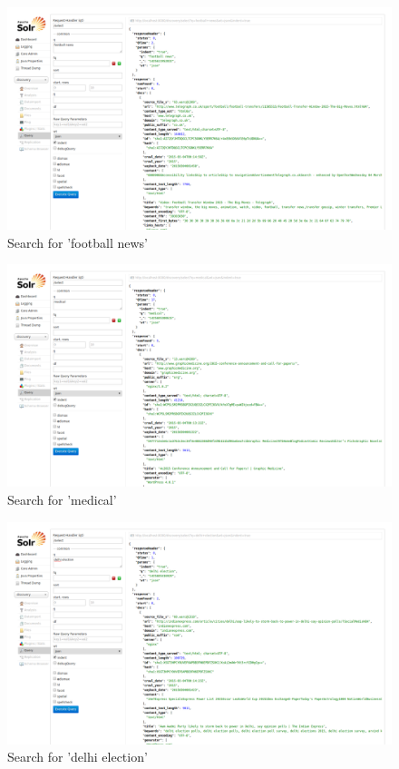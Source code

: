 \begin{figure}[ht]    
    \begin{center}
        \includegraphics[width=\paperwidth]{query2.png}
        \caption{Search for 'football news'}
    \end{center}
\end{figure}

\begin{figure}[ht]    
    \begin{center}
        \includegraphics[width=\paperwidth]{query3.png}
        \caption{Search for 'medical'}
    \end{center}
\end{figure}

\begin{figure}[ht]    
    \begin{center}
        \includegraphics[width=\paperwidth]{query4.png}
        \caption{Search for 'delhi election'}
    \end{center}
\end{figure}

